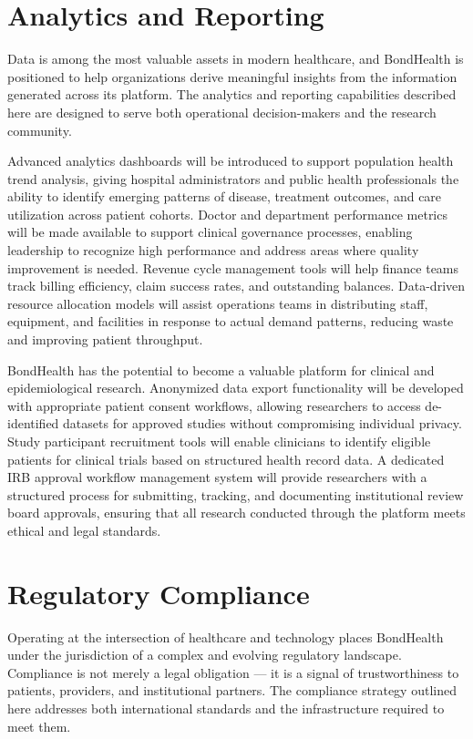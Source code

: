 \section{Analytics and Reporting}

\noindent Data is among the most valuable assets in modern healthcare, and BondHealth is positioned to help organizations derive meaningful insights from the information generated across its platform. The analytics and reporting capabilities described here are designed to serve both operational decision-makers and the research community.

\noindent Advanced analytics dashboards will be introduced to support population health trend analysis, giving hospital administrators and public health professionals the ability to identify emerging patterns of disease, treatment outcomes, and care utilization across patient cohorts. Doctor and department performance metrics will be made available to support clinical governance processes, enabling leadership to recognize high performance and address areas where quality improvement is needed. Revenue cycle management tools will help finance teams track billing efficiency, claim success rates, and outstanding balances. Data-driven resource allocation models will assist operations teams in distributing staff, equipment, and facilities in response to actual demand patterns, reducing waste and improving patient throughput.

\noindent BondHealth has the potential to become a valuable platform for clinical and epidemiological research. Anonymized data export functionality will be developed with appropriate patient consent workflows, allowing researchers to access de-identified datasets for approved studies without compromising individual privacy. Study participant recruitment tools will enable clinicians to identify eligible patients for clinical trials based on structured health record data. A dedicated IRB approval workflow management system will provide researchers with a structured process for submitting, tracking, and documenting institutional review board approvals, ensuring that all research conducted through the platform meets ethical and legal standards.

\section{Regulatory Compliance}

\noindent Operating at the intersection of healthcare and technology places BondHealth under the jurisdiction of a complex and evolving regulatory landscape. Compliance is not merely a legal obligation --- it is a signal of trustworthiness to patients, providers, and institutional partners. The compliance strategy outlined here addresses both international standards and the infrastructure required to meet them.

